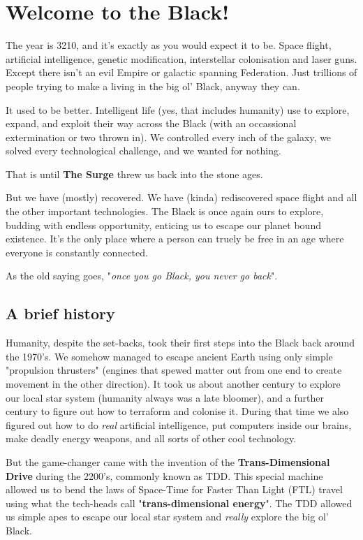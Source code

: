 \section{Welcome to the Black!}

\begin{multicols}{2}
  The year is 3210, and it's exactly as you would expect it to be. Space flight, artificial intelligence, genetic modification, interstellar colonisation and laser guns. Except there isn't an evil Empire or galactic spanning Federation. Just trillions of people trying to make a living in the big ol' Black, anyway they can.
  
  It used to be better. Intelligent life (yes, that includes humanity) use to explore, expand, and exploit their way across the Black (with an occassional extermination or two thrown in). We controlled every inch of the galaxy, we solved every technological challenge, and we wanted for nothing.
  
  That is until \textbf{The Surge} threw us back into the stone ages.

  But we have (mostly) recovered. We have (kinda) rediscovered space flight and all the other important technologies. The Black is once again ours to explore, budding with endless opportunity, enticing us to escape our planet bound existence. It's the only place where a person can truely be free in an age where everyone is constantly connected.
  
  As the old saying goes, "\textit{once you go Black, you never go back}".
  
  \subsection{A brief history}

  Humanity, despite the set-backs, took their first steps into the Black back around the 1970's. We somehow managed to escape ancient Earth using only simple "propulsion thrusters" (engines that spewed matter out from one end to create movement in the other direction). It took us about another century to explore our local star system (humanity always was a late bloomer), and a further century to figure out how to terraform and colonise it. During that time we also figured out how to do \textit{real} artificial intelligence, put computers inside our brains, make deadly energy weapons, and all sorts of other cool technology.

  But the game-changer came with the invention of the \textbf{Trans-Dimensional Drive} during the 2200's, commonly known as TDD. This special machine allowed us to bend the laws of Space-Time for Faster Than Light (FTL) travel using what the tech-heads call "\textbf{trans-dimensional energy}". The TDD allowed us simple apes to escape our local star system and \textit{really} explore the big ol' Black.


\end{multicols}
